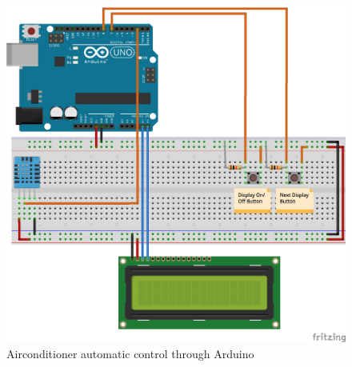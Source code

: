 \documentclass[conference]{IEEEtran}
\begin{document}
\begin{figure}[H]
\begin{center}
    \includegraphics[scale=0.4]{arduino}
    \caption{Airconditioner automatic control through Arduino} \label{fig:label}
\end{center}
\end{figure}
\end{document}
